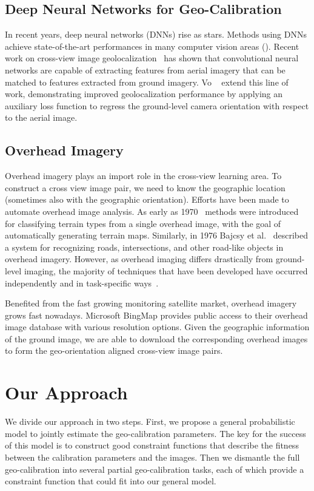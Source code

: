 \subsection{Deep Neural Networks for Geo-Calibration}
In recent years, deep neural networks (DNNs) rise as stars. Methods
using DNNs achieve state-of-the-art performances in
many computer vision areas (). 
Recent work on cross-view image
geolocalization~\cite{lin2013cross,lin2015learning,workman2015geocnn,workman2015wide}
 has shown that convolutional neural
networks are capable of extracting features from aerial imagery
that can be matched to features extracted from ground imagery.
Vo \etal~\cite{vo2016localizing} extend this line of work,
demonstrating improved geolocalization performance by applying an
auxiliary loss function to regress the ground-level camera orientation
with respect to the aerial image.


\subsection{Overhead Imagery}
Overhead imagery plays an import role in the cross-view learning area.
To construct a cross view image pair, we need to know the geographic
location (sometimes also with the geographic orientation).
 Efforts have been made to
automate overhead image analysis. As early as
1970~\cite{idelsohn1970learning} methods were introduced for
classifying terrain types from a single overhead image, with the goal
of automatically generating terrain maps.  Similarly, in 1976 Bajcsy
et al.~\cite{bajcsy1976computer} described a system for recognizing
roads, intersections, and other road-like objects in overhead imagery.
However, as overhead imaging differs drastically from ground-level
imaging, the majority of techniques that have been developed have
occurred independently and in task-specific ways~\cite{Rozen}.

Benefited from the fast growing monitoring satellite market, overhead
imagery grows fast nowadays. Microsoft BingMap provides public access
to their overhead image database with various resolution options.
Given the geographic information of the ground image, we are able to
download the corresponding overhead images to form the geo-orientation
aligned cross-view image pairs.

\section{Our Approach}
We divide our approach in two steps. First, we propose a general
probabilistic model to jointly estimate the geo-calibration
parameters. The key for the success of this model is to construct good
constraint functions that describe the fitness between the calibration
parameters and the images. Then we dismantle the full geo-calibration
into several partial geo-calibration tasks, each of which provide a
constraint function that could fit into our general model.

